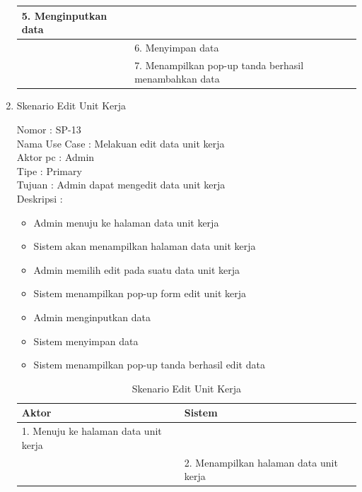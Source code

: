 \begin{enumerate}
\begin{table}
\begin{tabular}{ | l | p{65mm} |}
		\hline
		
		5.	Menginputkan data  & \\
		\hline
		
		& 6.	Menyimpan data \\
		\hline
		
		& 7.	Menampilkan pop-up tanda berhasil menambahkan data \\
		\hline
		
	\end{tabular}
\end{table}

\item Skenario Edit Unit Kerja

Nomor \kern 3.6pc : SP-13 \\
Nama Use Case : Melakuan edit data unit kerja \\
Aktor  pc : Admin \\
Tipe \kern 4.6pc : Primary \\
Tujuan \kern 3.6pc : Admin dapat mengedit data unit kerja \\
Deskripsi \kern 2.5pc : 

\begin{itemize}
	\item Admin menuju ke halaman data unit kerja
	\item Sistem akan menampilkan halaman data unit kerja
	\item Admin memilih edit pada suatu data unit kerja
	\item Sistem menampilkan pop-up form edit unit kerja
	\item Admin menginputkan data
	\item Sistem menyimpan data
	\item Sistem menampilkan pop-up tanda berhasil edit data
	
\end{itemize}

\begin{table}
	\caption{Skenario Edit Unit Kerja}
	\centering
	\begin{tabular}{ | p{58mm} | p{70mm} |}
		\hline 
		\textbf{Aktor} & \textbf{Sistem} \\
		\hline
		
		1.	Menuju ke halaman data unit kerja &  \\
		
		\hline
		
		&  2.	Menampilkan halaman data unit kerja \\
		

\end{tabular}
\end{table}
\end{enumerate}
